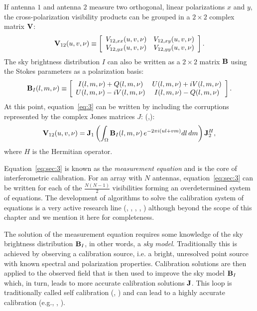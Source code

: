 If antenna $1$ and antenna $2$ measure two orthogonal, linear polarizations $x$ and $y$, the cross-polarization visibility products can be grouped in a $2 \times 2$ complex matrix ${\bf V}$:
\begin{equation}
    {\bf V}_{12} (u,v,\nu) \equiv 
    \left[ 
    \begin{array}{cc}
    V_{12,xx} (u,v,\nu) & V_{12,xy} (u,v,\nu) \\
    V_{12,yx} (u,v,\nu) & V_{12,yy} (u,v,\nu) \\
    \end{array}
    \right].   
\label{eq:sec:1}
\end{equation} 
The sky brightness distribution $I$ can also be written as a $2 \times 2$ matrix ${\bf B}$ using the Stokes parameters as a polarization basis:
\begin{equation}
    {\bf B}_I (l,m,\nu) \equiv 
    \left[
    \begin{array}{cc}
    I (l,m,\nu) + Q (l,m,\nu) & U (l,m,\nu) + iV (l,m,\nu) \\
    U (l,m,\nu) - iV (l,m,\nu) & I (l,m,\nu) - Q (l,m,\nu) \\
    \end{array}
    \right].   
\label{eq:sec:2}
\end{equation} 
At this point, equation~\ref{eq:3} can be written by including the corruptions represented by the complex Jones matrices $J$: (\cite{hamaker96},\cite{smirnov11}):
\begin{equation}
{\bf V}_{12} (u,v,\nu) = {\bf J}_1 \left( \int_\Omega {\bf B}_I (l, m, \nu) \, e^{-2 \pi i (ul + vm)} dl \, dm  \right) {\bf J}_2^H,
\label{eq:sec:3}
\end{equation}
where $H$ is the Hermitian operator.
 
Equation~\ref{eq:sec:3} is known as the {\it measurement equation} and is the core of interferometric calibration. For an array with $N$ antennas, equation~\ref{eq:sec:3} can be written for each of the $\frac{N (N - 1)}{2}$ visibilities forming an overdetermined system of equations. The development of  algorithms to solve the calibration system of equations is a very active research line (\cite{mitchell08}, \cite{kazemi11}, \cite{tasse14}, \cite{yatawatta15}, \cite{smirnov15}) although beyond the scope of this chapter and we mention it here for completeness.

The solution of the measurement equation requires some knowledge of the sky brightness distribution ${\bf B}_I$, in other words, a {\it sky model}. Traditionally this is achieved by observing a calibration source, i.e. a bright, unresolved point source with known spectral and polarization properties. Calibration solutions are then applied to the observed field that is then used to improve the sky model ${\bf B}_I$ which, in turn, leads to more accurate calibration solutions ${\bf J}$. This loop is traditionally called self calibration (\cite{cornwell81}, \cite{pearson84}) and can lead to a highly accurate calibration (e.g., \cite{bernardi10}, \cite{smirnov11b}).

